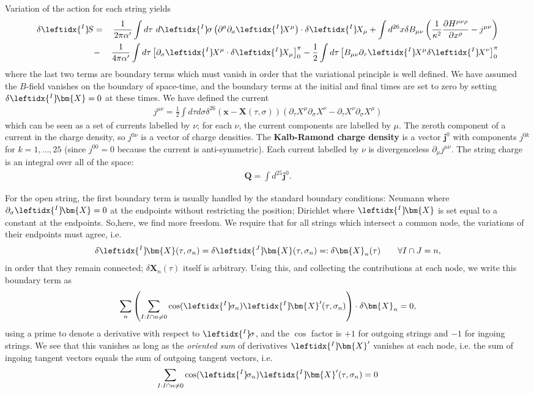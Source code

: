 \documentclass{article}
\newcommand{\be}{\begin{eqnarray}}
\newcommand{\ee}{\end{eqnarray}}
\def\X{\bm{X}}
\def\lI{\leftidx{^I} \! }
\def\lJ{\leftidx{^J} \! }
\begin{document}
Variation of the action for each string yields
\be
\delta \lI S &=& \frac{1}{2 \pi \alpha' } \int d\tau \ d \lI \sigma \left( \partial^a \partial_a \lI X^\mu \right) \cdot \delta \lI X_\mu
+ \int d^{26} x \delta B_{\mu \nu} \left(\frac{1}{\kappa^2} \frac{\partial H^{\mu \nu \rho}}{\partial x^\rho} - j^{\mu \nu} \right) \nonumber \\
&-& \frac{1}{4 \pi \alpha' } \int d \tau \left[ \partial_{\sigma} \lI X^\mu \cdot \delta \lI X_\mu \right]_{0}^{\pi} - \frac{1}{2} \int d \tau \left[ B_{\mu \nu} \partial_\tau \lI X^\mu \delta \lI X^\nu \right]_0^{\pi}
\label{varS}
\ee
where the last two terms are boundary terms which must vanish in order that the variational principle is well defined. We have assumed the $B$-field vanishes on the boundary of space-time, and the boundary terms at the initial and final times are set to zero by setting $\delta \lI \X = 0$ at these times. We have defined the current
\be
j^{\mu \nu} = \frac{1}{2} \int d \tau d \sigma \delta^{26}(\bm{x} - \X (\tau, \sigma)) \left( \partial_\tau X^\mu \partial_\sigma X^\nu - 
\partial_\tau X^\nu \partial_\sigma X^\mu \right)
\ee
which can be seen as a set of currents labelled by $\nu$; for each $\nu$, the current components are labelled by $\mu$. The zeroth component of a current in the charge density, so  $j^{0 \nu}$ is a vector of charge densities. The \textbf{Kalb-Ramond charge density} is a vector $\bm{j}^0$ with components $j^{0 k}$ for $k = 1, \ldots, 25$ (since $j^{00} = 0$ because the current is anti-symmetric).
Each current labelled by $\nu$ is divergenceless $\partial_\mu j^{\mu \nu}$. The string charge is an integral over all of the space:
\be
\bm{Q} = \int d^{25} \bm{j}^0 .
\ee


For the open string, the first boundary term is usually handled by the standard boundary conditions: Neumann where $\partial_\sigma \lI \X = 0$ at the endpoints without restricting the position; Dirichlet where $\lI \X$ is set equal to a constant at the endpoints.  So,here, we find more freedom. We require that for all strings which intersect a common node, the variations of their endpoints must agree, i.e.
\be
\delta \lI \X(\tau, \sigma_n) = \delta \lJ \X(\tau, \sigma_n) =: \delta \X_n(\tau)  \qquad \forall I \cap J = n,
\ee
in order that they remain connected; $\delta \X_n(\tau)$ itself is arbitrary. Using this, and collecting the contributions at each node, we write this boundary term as
\be
\sum_n \left( \sum_{I:I\cap n \ne 0} \cos(\lI \sigma_n) \lI \X'(\tau, \sigma_n)\right) \cdot \delta \X_n = 0,
\ee
using a prime to denote a derivative with respect to $\lI \sigma$, and the $\cos$ factor is $+1$ for outgoing strings and $-1$ for ingoing strings.
We see that this vanishes as long as the \textit{oriented sum} of derivatives $\lI \X'$ vanishes at each node, i.e. the sum of ingoing tangent vectors equals the sum of outgoing tangent vectors, i.e.
\be
\label{BC2}
\sum_{I:I\cap n \ne 0} \cos(\lI \sigma_n) \lI \X'(\tau, \sigma_n) = 0
\ee
\end{document}
